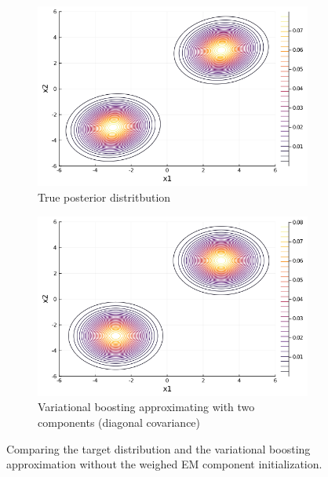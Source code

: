 \begin{figure}[H]
\centering
\begin{subfigure}{0.45\textwidth}
\includegraphics[width=1\linewidth]{../../plot/true_post_close.png}
\caption{True posterior distritbution}
\end{subfigure}
\begin{subfigure}{0.45\textwidth}
\includegraphics[width=1\linewidth]{../../plot/approx_post_close.png}
\caption{Variational boosting approximating with two components (diagonal covariance)}
\end{subfigure}
\caption{Comparing the target distribution and the variational boosting approximation without the weighed EM component initialization.}
\label{fig:success}
\end{figure}
